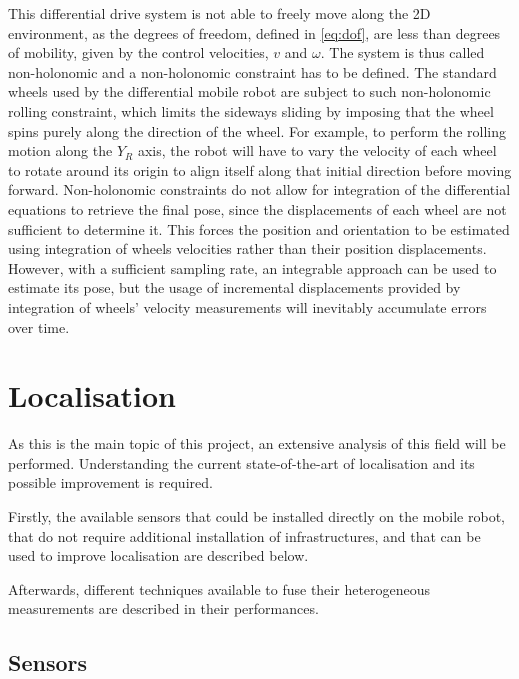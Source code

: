 \noindent
This differential drive system is not able to freely move along the \gls{2D} environment, as the degrees of freedom, defined in \eqref{eq:dof}, are less than degrees of mobility, given by the control velocities, $v$ and $\omega$.
The system is thus called non-holonomic and a non-holonomic constraint has to be defined.
The standard wheels used by the differential mobile robot are subject to such non-holonomic rolling constraint, which limits the sideways sliding by imposing that the wheel spins purely along the direction of the wheel.
For example, to perform the rolling motion along the $Y_R$ axis, the robot will have to vary the velocity of each wheel to rotate around its origin to align itself along that initial direction before moving forward.
Non-holonomic constraints do not allow for integration of the differential equations to retrieve the final pose, since the displacements of each wheel are not sufficient to determine it.
This forces the position and orientation to be estimated using integration of wheels velocities rather than their position displacements.
However, with a sufficient sampling rate, an integrable approach can be used to estimate its pose, but the usage of incremental displacements provided by integration of wheels' velocity measurements will inevitably accumulate errors over time.
 
    
\section{Localisation}


\noindent As this is the main topic of this project, an extensive analysis of this field will be performed.
Understanding the current state-of-the-art of localisation and its possible improvement is required.

Firstly, the available sensors that could be installed directly on the mobile robot, that do not require additional installation of infrastructures, and that can be used to improve localisation are described below.

Afterwards, different techniques available to fuse their heterogeneous measurements are described in their performances. 


\subsection{Sensors}

    

